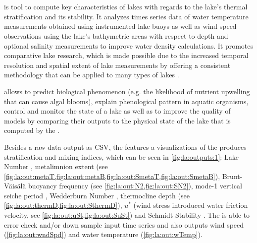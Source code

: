 \chapter{\la}
  \la is tool to compute key characteristics of lakes with regards to the lake's thermal stratification and its stability. It analyzes times series data of water temperature measurements obtained using instrumented lake buoys as well as wind speed observations using the lake's bathymetric areas with respect to depth and optional salinity measurements to improve water density calculations. It promotes comparative lake research, which is made possible due to the increased temporal resolution and spatial extent of lake measurements by offering a consistent methodology that can be applied to many types of lakes \citep{read2011derivation}.

  \la allows to predict biological phenomenon (e.g. the likelihood of nutrient upwelling that can cause algal blooms), explain phenological pattern in aquatic organisms, control and monitor the state of a lake as well as to improve the quality of models by comparing their outputs to the physical state of the lake that is computed by the \la.

  Besides a raw data output as \ac{CSV}, the \la features a visualizations of the produces stratification and mixing indices, which can be seen in \cref{fig:la:outputs:1}: Lake Number \citep[see \cref{fig:la:out:Ln,fig:la:out:SLn},][]{imberger1990}, metalimnion extent (see \cref{fig:la:out:metaT,fig:la:out:metaB,fig:la:out:SmetaT,fig:la:out:SmetaB}), Brunt-Väisälä buoyancy frequency (see \cref{fig:la:out:N2,fig:la:out:SN2}), mode-1 vertical seiche period \citep[see \cref{fig:la:out:T1,fig:la:out:ST1},][]{monismith1986}, Wedderburn Number \citep[see \cref{fig:la:out:W,fig:la:out:SW},][]{thompson1980}, thermocline depth (see \cref{fig:la:out:thermD,fig:la:out:SthermD}), $u^{*}$ (wind stress introduced water friction velocity, see \cref{fig:la:out:uSt,fig:la:out:SuSt}) and Schmidt Stability \citep[see \cref{fig:la:out:St},][]{schmidt1928,hutchinson1957,idso1973}. The \la is able to error check and/or down sample input time series and also outputs wind speed (\cref{fig:la:out:wndSpd}) and water temperature (\cref{fig:la:out:wTemp}).

